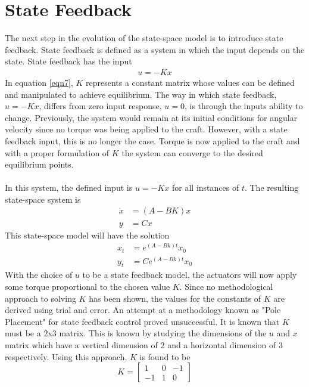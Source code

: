 \documentclass[12pt]{article}
\begin{document}
\section{State Feedback}
The next step in the evolution of the state-space model is to introduce state feedback. State feedback is defined as a system in which the input depends on the state. State feedback has the input
\begin{align}
\label{eqn7}
u = -Kx
\end{align}
In equation \ref{eqn7}, $K$ represents a constant matrix whose values can be defined and manipulated to achieve equilibrium. The way in which state feedback,$u=-Kx$, differs from zero input response, $u=0$, is through the inputs ability to change. Previously, the system would remain at its initial conditions for angular velocity since no torque was being applied to the craft. However, with a state feedback input, this is no longer the case. Torque is now applied to the craft and with a proper formulation of $K$ the system can converge to the desired equilibrium points. 
\\ \\ 
In this system, the defined input is $u=-Kx$ for all instances of $t$. The resulting state-space system is
\begin{align*}
\dot{x} &= (A-BK)x \\
y &= Cx
\end{align*}
This state-space model will have the solution
\begin{equation}
\begin{aligned}
x_{t} &= e^{(A-Bk)t}x_{0} \\
y_{t} &= Ce^{(A-Bk)t}x_{0}
\end{aligned}
\end{equation}
With the choice of $u$ to be a state feedback model, the actuators will now apply some torque proportional to the chosen value $K$. Since no methodological approach to solving $K$ has been shown, the values for the constants of $K$ are derived using trial and error. An attempt at a methodology known as "Pole Placement" for state feedback control  proved unsuccessful. It is known that $K$ must be a 2x3 matrix. This is known by studying the dimensions of the $u$ and $x$ matrix which have a vertical dimension of 2 and a horizontal dimension of 3 respectively. Using this approach, $K$ is found to be
\begin{equation}
K = 
\begin{bmatrix} 
1 & 0 & -1
\\
-1 & 1 & 0
\end{bmatrix}
\end{equation}
\end{document}
